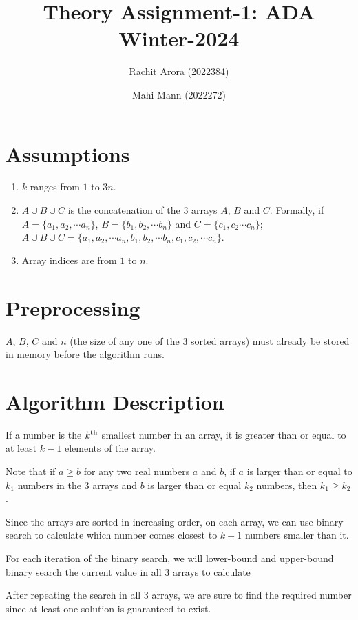 \documentclass{article}
\title{Theory Assignment-1: ADA Winter-2024}
\author{Rachit Arora (2022384) \and Mahi Mann (2022272)}
\date{}
\begin{document}
\maketitle

\section{Assumptions}

\begin{enumerate}
    \item $k$ ranges from $1$ to $3n$.
    \item $A \cup B \cup C$ is the concatenation of the 3 arrays $A$, $B$ and $C$. Formally, if $A = \{ a_1 , a_2 , \cdots a_n \}$, $B = \{ b_1 , b_2 , \cdots b_n \}$ and $C = \{ c_1 , c_2 \cdots c_n \}$; $A \cup B \cup C = \{ a_1 , a_2 , \cdots a_n , b_1 , b_2 , \cdots b_n , c_1 , c_2 , \cdots c_n\}$.   
    \item Array indices are from $1$ to $n$.
\end{enumerate}

\section{Preprocessing}
$A$, $B$, $C$ and $n$ (the size of any one of the 3 sorted arrays) must already be stored in memory before the algorithm runs. 

\section{Algorithm Description}

If a number is the $k \textsuperscript{th}$ smallest number in an array, it is greater than or equal to at least $k-1$ elements of the array. 

Note that if $a \geq b$ for any two real numbers $a$ and $b$, if $a$ is larger than or equal to $k_1$ numbers in the 3 arrays and $b$ is larger than or equal $k_2$ numbers, then $k_1 \geq k_2$. 

Since the arrays are sorted in increasing order, on each array, we can use binary search to calculate which number comes closest to $k-1$ numbers smaller than it. 

For each iteration of the binary search, we will lower-bound and upper-bound binary search the current value in all 3 arrays to calculate 

After repeating the search in all 3 arrays, we are sure to find the required number since at least one solution is guaranteed to exist.
\end{document}
